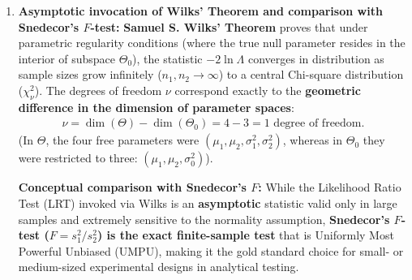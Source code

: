\begin{solproblema}
\begin{enumerate}
		\item \textbf{Asymptotic invocation of Wilks' Theorem and comparison with Snedecor's $F$-test:}
		\textbf{Samuel S. Wilks' Theorem} proves that under parametric regularity conditions (where the true null parameter resides in the interior of subspace $\Theta_0$), the statistic $-2\ln\Lambda$ converges in distribution as sample sizes grow infinitely ($n_1, n_2 \to \infty$) to a central Chi-square distribution ($\chi^2_\nu$).
		The degrees of freedom $\nu$ correspond exactly to the \textbf{geometric difference in the dimension of parameter spaces}:
		\begin{align}
			\nu = \dim(\Theta) - \dim(\Theta_0) = 4 - 3 = 1 \text{ degree of freedom.}
		\end{align}
		(In $\Theta$, the four free parameters were $(\mu_1, \mu_2, \sigma_1^2, \sigma_2^2)$, whereas in $\Theta_0$ they were restricted to three: $(\mu_1, \mu_2, \sigma_0^2)$).
		
		\textbf{Conceptual comparison with Snedecor's $F$:} While the Likelihood Ratio Test (LRT) invoked via Wilks is an \textbf{asymptotic} statistic valid only in large samples and extremely sensitive to the normality assumption, \textbf{Snedecor's $F$-test ($F = s_1^2 / s_2^2$) is the exact finite-sample test} that is Uniformly Most Powerful Unbiased (UMPU), making it the gold standard choice for small- or medium-sized experimental designs in analytical testing.
	\end{enumerate}
\end{solproblema}

